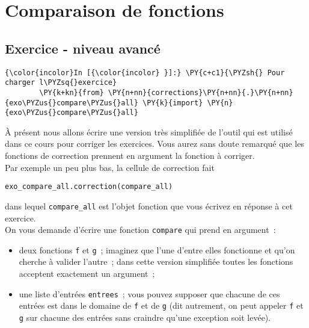     \hypertarget{comparaison-de-fonctions}{%
\section{Comparaison de fonctions}\label{comparaison-de-fonctions}}

    \hypertarget{exercice---niveau-avancuxe9}{%
\subsection{Exercice - niveau
avancé}\label{exercice---niveau-avancuxe9}}

    \begin{Verbatim}[commandchars=\\\{\}]
{\color{incolor}In [{\color{incolor} }]:} \PY{c+c1}{\PYZsh{} Pour charger l\PYZsq{}exercice}
        \PY{k+kn}{from} \PY{n+nn}{corrections}\PY{n+nn}{.}\PY{n+nn}{exo\PYZus{}compare\PYZus{}all} \PY{k}{import} \PY{n}{exo\PYZus{}compare\PYZus{}all}
\end{Verbatim}


    À présent nous allons écrire une version très simplifiée de l'outil qui
est utilisé dans ce cours pour corriger les exercices. Vous aurez sans
doute remarqué que les fonctions de correction prennent en argument la
fonction à corriger.\\

Par exemple un peu plus bas, la cellule de correction fait

\begin{verbatim}
exo_compare_all.correction(compare_all)  
\end{verbatim}

dans lequel \texttt{compare\_all} est l'objet fonction que vous écrivez
en réponse à cet exercice.\\

    On vous demande d'écrire une fonction \texttt{compare} qui prend en
argument~:

\begin{itemize}
	\item 
	deux fonctions \texttt{f} et \texttt{g}~; imaginez que
	l'une d'entre elles fonctionne et qu'on cherche à valider l'autre~; dans
	cette version simplifiée toutes les fonctions acceptent exactement un
	argument~;
	\item
	une liste d'entrées \texttt{entrees}~; vous pouvez supposer
	que chacune de ces entrées est dans le domaine de \texttt{f} et de
	\texttt{g} (dit autrement, on peut appeler \texttt{f} et \texttt{g} sur
	chacune des entrées sans craindre qu'une exception soit levée).
\end{itemize}


